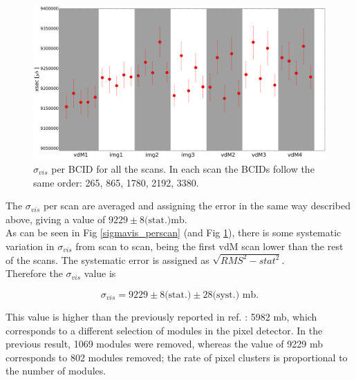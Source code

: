   

\begin{center}
  \begin{figure}[ht]
    \centering
    \includegraphics[scale=.25]{Chapter4/plots_thesis/Poly2G_xsec.png}
    \caption[$\sigma_{vis}$ per BCID for all scans]{ $\sigma_{vis}$ per BCID for all the scans.  In each scan the BCIDs follow the same order: 265, 865, 1780, 2192, 3380.} %
    \label{sigmavis_perbcid}
  \end{figure}
\end{center}

The $\sigma_{vis}$ per scan are averaged and assigning the error in the same way described above, giving a value of $9229 \pm 8 \text{(stat.)} \text{mb}$.\\
As can be seen in  Fig \ref{sigmavis_perscan}  (and Fig \ref{sigmavis_perbcid}), there is some systematic variation in $\sigma_{vis}$ from scan to scan, being the first vdM scan lower than the rest of the scans. The systematic error is assigned as $\sqrt{RMS^{2}-stat^{2}}$. \\
Therefore the $\sigma_{vis}$ value is

\begin{equation}
\sigma_{vis} = 9229 \pm 8 \text{(stat.)} \pm 28 \text{(syst.)} \text{ mb} .
\end{equation}

This value is higher than the previously reported in ref. \cite{pas_18}: 5982 mb, which corresponds to a different selection of modules in the pixel detector. In the previous result, 1069 modules were removed, whereas the value of 9229 mb corresponds to 802 modules removed; the rate of pixel clusters is proportional to the number of modules.

